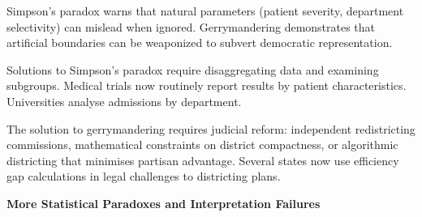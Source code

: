 Simpson's paradox warns that natural parameters (patient severity, department selectivity) can mislead when ignored. Gerrymandering demonstrates that artificial boundaries can be weaponized to subvert democratic representation.

Solutions to Simpson's paradox require disaggregating data and examining subgroups. Medical trials now routinely report results by patient characteristics. Universities analyse admissions by department.

The solution to gerrymandering requires judicial reform: independent redistricting commissions, mathematical constraints on district compactness, or algorithmic districting that minimises partisan advantage. Several states now use efficiency gap calculations in legal challenges to districting plans.



\newpage

\begin{center}
{\Large \textbf{More Statistical Paradoxes and Interpretation Failures}}

\end{center}

\vspace{1em}

